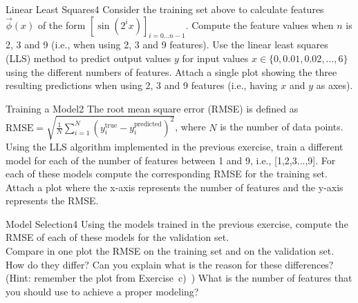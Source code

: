 \begin{questions}
	
	
	\begin{question}{Linear Least Squares}{4}
		Consider the training set above to calculate features $\vec{\phi}(x)$ of the form $[\sin(2^{i}x)]_{i = 0 \ldots n-1}$. 
		Compute the feature values when $n$ is 2, 3 and 9 (i.e., when using 2, 3 and 9 features). 
		Use the linear least squares (LLS) method to predict output values $y$ for input values $x\in\{0, 0.01, 0.02, \ldots, 6\}$ using the different numbers of features. 
		Attach a single plot showing the three resulting predictions when using 2, 3 and 9 features (i.e., having $x$ and $y$ as axes).
		
\begin{answer}
\end{answer}
		
	\end{question}
	
	
	
	\begin{question}{Training a Model}{2}
		The root mean square error (RMSE) is defined as $\text{RMSE} = \sqrt{\frac{1}{N}\sum_{i=1}^{N}(y^{\text{true}}_i-y^{\text{predicted}}_i)^{2}}$, where $N$ is the number of data points. 
		Using the LLS algorithm implemented in the previous exercise, train a different model for each of the number of features between 1 and 9, i.e.,  [1,2,3...,9].
		For each of these models compute the corresponding RMSE for the training set. 
		Attach a plot where the x-axis represents the number of features and the y-axis represents the RMSE.
		
\begin{answer}
\end{answer}
		
	\end{question}
	
	
	
	\begin{question}{Model Selection}{4}
		Using the models trained in the previous exercise, compute the RMSE of each of these models for the validation set.\\
		Compare in one plot the RMSE on the training set and on the validation set. 
		How do they differ? 
		Can you explain what is the reason for these differences? (Hint: remember the plot from Exercise~c)~) 
		What is the number of features that you should use to achieve a proper modeling?
		

\end{question}
\end{questions}

